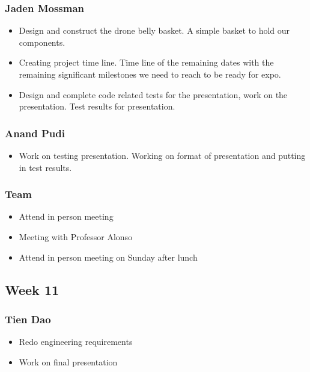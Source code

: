 \documentclass[12pt]{article}
\begin{document}
            \subsubsection*{Jaden Mossman}
                \begin{itemize}
                    \item Design and construct the drone belly basket. A simple basket to hold our components.
                    \item Creating project time line. Time line of the remaining dates with the remaining significant milestones we need to reach to be ready for expo.
                    \item Design and complete code related tests for the presentation, work on the presentation. Test results for presentation.
                \end{itemize}
            \subsubsection*{Anand Pudi}
                \begin{itemize}
                    \item Work on testing presentation. Working on format of presentation and putting in test results.
                \end{itemize}
            \subsubsection*{Team}
                \begin{itemize}
                    \item Attend in person meeting
                    \item Meeting with Professor Alonso
                    \item Attend in person meeting on Sunday after lunch
                \end{itemize}
        
        \subsection*{Week 11}
            \subsubsection*{Tien Dao}
                \begin{itemize}
                    \item Redo engineering requirements
                    \item Work on final presentation
                \end{itemize}
\end{document}
